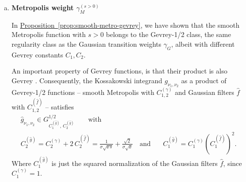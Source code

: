 \begin{enumerate}[(a)]
    To see the mechanism concretely: after splitting the integral at $\omega_\text{kink} = -\beta\sigma^2/2$ and applying the Euler-Maclaurin formula on each half, the trapezoidal error for the $(\nu_1, \nu_2)$ Kossakowski entry is 
    $$
       \frac{\omega_0^2}{12}\,|\Delta g'| = \frac{\beta\,\omega_0^2}{12}\,|\hat{f}(\omega_{\mathrm{kink}} - \nu_1)|\hat{f}(\omega_{\mathrm{kink}} - \nu_2)|, 
    $$
    Summing over rounded Bohr-frequency pairs via \cite[Lemma C.1]{chen2023quantum} and using that $\sum_\nu \|A_\nu\|^2 \leq 1$ together with $|\hat{f}| \leq \|\hat{f}\|_\infty$ this aggregates to a total quadrature error of $\mathcal{O}(\beta \omega_0^2)$. Every other error contributions in the triangle inequalities (e.g. Gaussian aliasing, time truncation, spectral leakage from off-grid Bohr frequencies) otherwise converges exponentially in $1 / \omega_0$, which makes this algebraic quadrature error scaling stick out.

    \item \textbf{Metropolis weight $\gamma_M^{(s > 0)}$}
    
    In \hyperref[prop:smooth-metro-gevrey]{Proposition~\ref*{prop:smooth-metro-gevrey}}, we have shown that the smooth Metropolis function with $s > 0$ belongs to the Gevrey-1/2 class, the same regularity class as the Gaussian transition weights $\gamma_G$, albeit with different Gevrey constants $C_1, C_2$.
    
    An important property of Gevrey functions, is that their product is also Gevrey \cite[Lemma 26]{ding2025efficient}. Consequently, the Kossakowski integrand $g_{\nu_1, \nu_2}$ as a product of Gevrey-1/2 functions -- smooth Metropolis with $C_{1,2}^{(\gamma)}$ and Gaussian filters $\hat{f}$ with $C_{1,2}^{(\hat{f})}$ -- satisfies
    \begin{equation} \label{eq:gevrey-product-integrand}
        \begin{split}
            \hat{g}_{\nu_1,\nu_2} \in G^{1/2}_{C_1^{(\hat{g})},\, C_2^{(\hat{g})}} \qquad\text{with}& \\
            C_2^{(\hat{g})} = C_2^{(\gamma)} + 2\,C_2^{(\hat{f})} = \frac{1}{\sigma\sqrt{\ee\,s}} + \frac{\sqrt{2}}{\sigma \sqrt{\ee}} \quad\text{and}&\quad C_1^{(\hat{g})} = C_1^{(\gamma)}\left(C_1^{(\hat{f})}\right)^2.
        \end{split}
    \end{equation}
    Where $C_1^{(\hat{g})}$ is just the squared normalization of the Gaussian filters $\hat{f}$, since $C_1^{(\gamma)} = 1$.


\end{enumerate}
